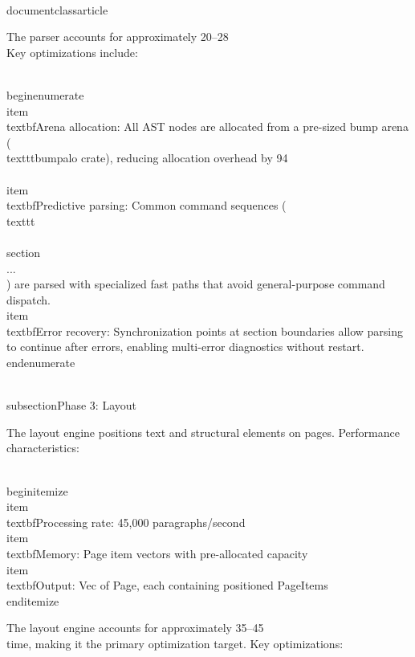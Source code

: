 \\documentclass{article}
\begin{document}
The parser accounts for approximately 20--28\\%
Key optimizations include:

\\begin{enumerate}
  \\item \\textbf{Arena allocation}: All AST nodes are allocated from a
    pre-sized bump arena (\\texttt{bumpalo} crate), reducing allocation
    overhead by 94\\%
  \\item \\textbf{Predictive parsing}: Common command sequences
    (\\texttt{\\\\section\\{...\\}}) are parsed with specialized fast
    paths that avoid general-purpose command dispatch.
  \\item \\textbf{Error recovery}: Synchronization points at section
    boundaries allow parsing to continue after errors, enabling multi-error
    diagnostics without restart.
\\end{enumerate}

\\subsection{Phase 3: Layout}

The layout engine positions text and structural elements on pages.
Performance characteristics:

\\begin{itemize}
  \\item \\textbf{Processing rate}: 45,000 paragraphs/second
  \\item \\textbf{Memory}: Page item vectors with pre-allocated capacity
  \\item \\textbf{Output}: Vec of Page, each containing positioned PageItems
\\end{itemize}

The layout engine accounts for approximately 35--45\\%
time, making it the primary optimization target. Key optimizations:
\end{document}
